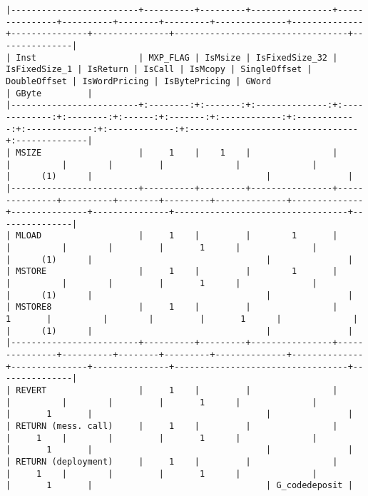 \documentclass[varwidth=\maxdimen,margin=0.5cm,multi={verbatim}]{standalone}
\begin{document}
\begin{verbatim}
|-------------------------+----------+---------+----------------+---------------+----------+--------+---------+--------------+--------------+---------------+---------------+----------------------------------+---------------|
| Inst                    | MXP_FLAG | IsMsize | IsFixedSize_32 | IsFixedSize_1 | IsReturn | IsCall | IsMcopy | SingleOffset | DoubleOffset | IsWordPricing | IsBytePricing | GWord                            | GByte         |
|-------------------------+:--------:+:-------:+:--------------:+:-------------:+:--------:+:------:+:-------:+:------------:+:------------:+:-------------:+:-------------:+:---------------------------------+:--------------|
| MSIZE                   |     1    |    1    |                |               |          |        |         |              |              |               |      (1)      |                                  |               |
|-------------------------+----------+---------+----------------+---------------+----------+--------+---------+--------------+--------------+---------------+---------------+----------------------------------+---------------|
| MLOAD                   |     1    |         |        1       |               |          |        |         |       1      |              |               |      (1)      |                                  |               |
| MSTORE                  |     1    |         |        1       |               |          |        |         |       1      |              |               |      (1)      |                                  |               |
| MSTORE8                 |     1    |         |                |       1       |          |        |         |       1      |              |               |      (1)      |                                  |               |
|-------------------------+----------+---------+----------------+---------------+----------+--------+---------+--------------+--------------+---------------+---------------+----------------------------------+---------------|
| REVERT                  |     1    |         |                |               |          |        |         |       1      |              |               |       1       |                                  |               |
| RETURN (mess. call)     |     1    |         |                |               |     1    |        |         |       1      |              |               |       1       |                                  |               |
| RETURN (deployment)     |     1    |         |                |               |     1    |        |         |       1      |              |               |       1       |                                  | G_codedeposit |

\end{verbatim}
\end{document}
